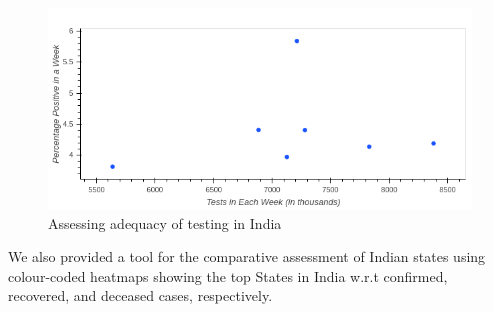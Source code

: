 \documentclass[letterpaper]{article} %
\begin{document}
\begin{itemize}
\begin{itemize}
\begin{quote}
\begin{enumerate}
				\end{enumerate}
			\end{quote}
			\begin{figure}[h!]
				\centering
				\includegraphics[width=1\linewidth]{pp}
				\caption{Assessing adequacy of testing in India}
				\label{fig:pp}
			\end{figure}
			
		\end{itemize}
	\end{itemize}
	We also provided a tool for the comparative assessment of Indian states using colour-coded heatmaps showing the top States in India w.r.t confirmed, recovered, and deceased cases, respectively. 
	
\end{document}
